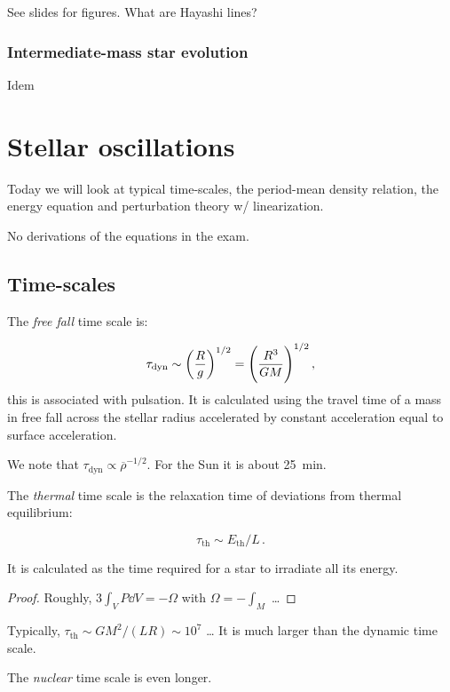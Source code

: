 \documentclass[main.tex]{subfiles}
\begin{document}
See slides for figures. What are Hayashi lines?

\subsubsection{Intermediate-mass star evolution}

Idem

\section{Stellar oscillations}

Today we will look at typical time-scales, the period-mean density relation, the energy equation and perturbation theory w/ linearization.

No derivations of the equations in the exam.

\subsection{Time-scales}

The \emph{free fall} time scale is:

\begin{equation}
  \tau_{\text{dyn}} \sim \qty(\frac{R}{g} )^{1/2} = \qty(\frac{R^3}{GM} )^{1/2}\,,
\end{equation}
%
this is associated with pulsation. It is calculated using the travel time of a mass in free fall across the stellar radius accelerated by constant acceleration equal to surface acceleration.

We note that \(\tau_{\text{dyn}} \propto \overline{\rho} ^{-1/2} \). For the Sun it is about \SI{25}{min}.

The \emph{thermal} time scale is the relaxation time of deviations from thermal equilibrium:

\begin{equation}
  \tau_{\text{th}} \sim E_{\text{th}} / L\,.
\end{equation}

It is calculated as the time required for a star to irradiate all its energy.

\begin{proof}
    Roughly, \(3 \int_V P \dd{V} = - \Omega\) with  \(\Omega = - \int_M \) \dots
\end{proof}

Typically, \(\tau_{\text{th}} \sim G M^2 /(LR) \sim 10^7 \) \dots
It is much larger than the dynamic time scale.

The \emph{nuclear} time scale is even longer.
\end{document}
